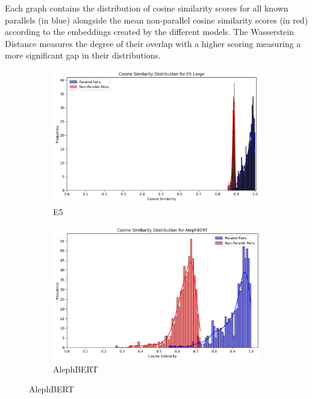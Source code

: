 \documentclass[12pt]{article}
\begin{document}
Each graph contains the distribution of cosine similarity scores for all known parallels (in blue) alongside the mean non-parallel cosine similarity scores (in red) according to the embeddings created by the different models. The Wasserstein Distance measures the degree of their overlap with a higher scoring measuring a more significant gap in their distributions.

\begin{figure}[htbp]
\centering

\begin{subfigure}{0.45\textwidth}
    \centering
    \includegraphics[width=\linewidth]{nonpar_par_histogram_E5Large.png}
    \caption{E5}
    \label{fig:e5_dist}
\end{subfigure}
\hfill
\begin{subfigure}{0.45\textwidth}
    \centering
    \includegraphics[width=\linewidth]{nonpar_par_histogram_AlephBERT.png}
    \caption{AlephBERT}
    \label{fig:alephbert_dist}
\end{subfigure}


\end{figure}
\end{document}
